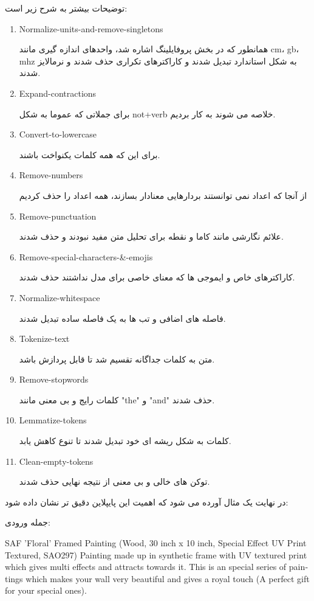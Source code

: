 \documentclass[a4paper,12pt]{article}
\begin{document}
	توضیحات بیشتر به شرح زیر است:
	\begin{enumerate}
		\item Normalize-units-and-remove-singletons
		
		همانطور که در بخش پروفایلینگ اشاره شد، واحدهای اندازه گیری مانند cm، gb، mhz به شکل استاندارد تبدیل شدند و کاراکترهای تکراری حذف شدند و نرمالایز شدند. 
		
		\item Expand-contractions
		
		برای جملاتی که عموما به شکل not+verb خلاصه می شوند به کار بردیم. 
		\item Convert-to-lowercase
		
		برای این که همه کلمات یکنواخت باشند.
		\item Remove-numbers
		
		از آنجا که اعداد نمی توانستند بردارهایی معنادار بسازند، همه اعداد را حذف کردیم
		\item Remove-punctuation
		
		علائم نگارشی مانند کاما و نقطه برای تحلیل متن مفید نبودند و حذف شدند.
		\item Remove-special-characters-\&-emojis
		
		کاراکترهای خاص و ایموجی ها که معنای خاصی برای مدل نداشتند حذف شدند.
		\item Normalize-whitespace
		
		فاصله های اضافی و تب ها به یک فاصله ساده تبدیل شدند.
		\item Tokenize-text
		
		متن به کلمات جداگانه تقسیم شد تا قابل پردازش باشد.
		\item Remove-stopwords
		
		کلمات رایج و بی معنی مانند "the" و "and" حذف شدند.
		\item Lemmatize-tokens
		
		کلمات به شکل ریشه ای خود تبدیل شدند تا تنوع کاهش یابد.
		\item Clean-empty-tokens
		
		توکن های خالی و بی معنی از نتیجه نهایی حذف شدند.
	\end{enumerate}
	در نهایت یک مثال آورده می شود که اهمیت این پایپلاین دقیق تر نشان داده شود:
	
	جمله ورودی:
	\begin{latin}
		SAF 'Floral' Framed Painting (Wood, 30 inch x 10 inch, Special Effect UV Print Textured, SAO297) Painting made up in synthetic frame with UV textured print which gives multi effects and attracts towards it. This is an special series of paintings which makes your wall very beautiful and gives a royal touch (A perfect gift for your special ones).
	\end{latin}
	
\end{document}
